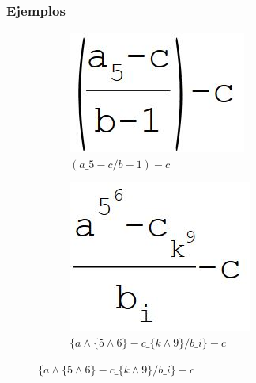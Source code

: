 \newpage
\subsubsection{Ejemplos}
\begin{figure}[htbp]
	\centering
	\begin{subfigure}[b]{0.3\textwidth}
	  \includegraphics[width=\textwidth]{imgs/test1}
	  \caption{$(a \_ 5-c/b-1)-c$}
	\end{subfigure}
	\quad
	\begin{subfigure}[b]{0.3\textwidth}
	  \includegraphics[width=\textwidth]{imgs/test2}
	  \caption{$\{a \wedge \{5 \wedge 6\}-c \_ \{k \wedge 9\}/b \_ i\}-c$}
	\end{subfigure}

\end{figure}
